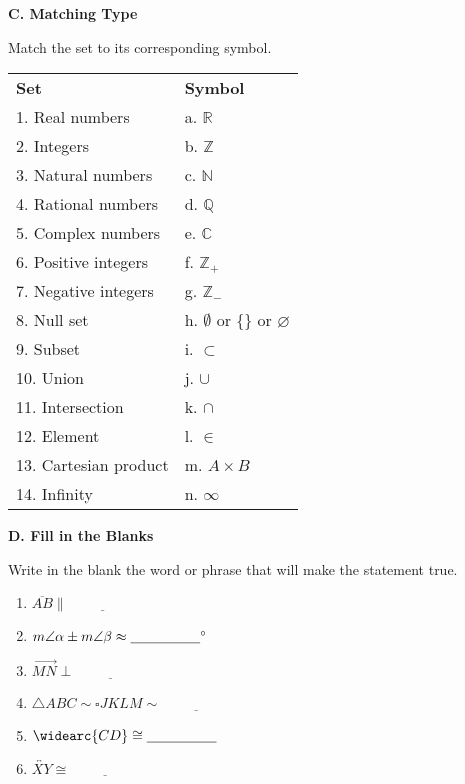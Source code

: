 \documentclass[12pt, letterpaper]{article}
\newcommand{\blank}{\underline{\hspace{5em}}}
\begin{document}
	\vspace*{1.3ex}
	
	\noindent \textbf{C. Matching Type} 
	
	Match the set to its corresponding symbol.

    \begin{center}
    	\begin{tabularx}{5in}{ X X }
    		
    	\parbox[c]{1.5in}{\centering\textbf{Set}} &  \textbf{Symbol}\\
    	
    	1. Real numbers &  a. $ \mathbb{R} $ \\
    	2. Integers &  b. $ \mathbb{Z} $ \\
    	3. Natural numbers &   c. $ \mathbb{N} $ \\
    	4. Rational numbers  &  d. $ \mathbb{Q} $ \\
    	5. Complex numbers  &  e. $ \mathbb{C} $ \\
    	6. Positive integers  &  f. $ \mathbb{Z}_+ $ \\
    	7. Negative integers  &  g. $ \mathbb{Z}_- $ \\
    	8. Null set  & h. $ \emptyset $ or \{\} or $ \varnothing $ \\
    	9. Subset & i. $ \subset $ \\
    	10. Union  & j. $ \cup $ \\
    	11. Intersection  & k.  $ \cap $ \\
    	 12. Element   & l.  $ \in $ \\
    	13. Cartesian product & m. $ A \times B $ \\
    	14. Infinity & n. $ \infty $
    \end{tabularx}
    \end{center}
 
	\newpage
	
	\noindent \textbf{D. Fill in the Blanks} 
	
	Write in the blank the word or phrase that will make the statement true.
	
	\begin{enumerate}[start=15]
			\item  $ \overline{AB} \parallel \blank $
			\item  $ m \angle \alpha \pm m\angle \beta \approx \blank \degree $ 
			\item  $ \overrightarrow{MN} \perp \blank $
			\item  $ \triangle ABC \sim \square JKLM \sim \blank $
			\item  $ \widearc{CD} \cong  \blank $
			\item $ \overleftrightarrow{XY} \cong \blank $
	\end{enumerate}
		  
\end{document}
